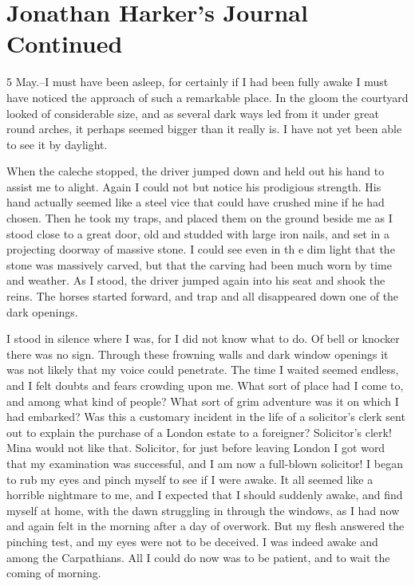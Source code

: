 \chapter{Jonathan Harker's Journal Continued}

5 May.--I must have been asleep, for certainly if I had been fully awake I must have noticed the approach of such a remarkable place. In the gloom the courtyard looked of considerable size, and as several dark ways led from it under great round arches, it perhaps seemed bigger than it really is. I have not yet been able to see it by daylight. 

When the caleche stopped, the driver jumped down and held out his hand to assist me to alight. Again I could not but notice his prodigious strength. His hand actually seemed like a steel vice that could have crushed mine if he had chosen. Then he took my traps, and placed them on the ground beside me as I stood close to a great door, old and studded with large iron nails, and set in a projecting doorway of massive stone. I could see even in th e dim light that the stone was massively carved, but that the carving had been much worn by time and weather. As I stood, the driver jumped again into his seat and shook the reins. The horses started forward, and trap and all disappeared down one of the dark openings. 

I stood in silence where I was, for I did not know what to do. Of bell or knocker there was no sign. Through these frowning walls and dark window openings it was not likely that my voice could penetrate. The time I waited seemed endless, and I felt doubts and fears crowding upon me. What sort of place had I come to, and among what kind of people? What sort of grim adventure was it on which I had embarked? Was this a customary incident in the life of a solicitor's clerk sent out to explain the purchase of a London estate to a foreigner? Solicitor's clerk! Mina would not like that. Solicitor, for just before leaving London I got word that my examination was successful, and I am now a full-blown solicitor! I began to rub my eyes and pinch myself to see if I were awake. It all seemed like a horrible nightmare to me, and I expected that I should suddenly awake, and find myself at home, with the dawn struggling in through the windows, as I had now and again felt in the morning after a day of overwork. But my flesh answered the pinching test, and my eyes were not to be deceived. I was indeed awake and among the Carpathians. All I could do now was to be patient, and to wait the coming of morning. 

